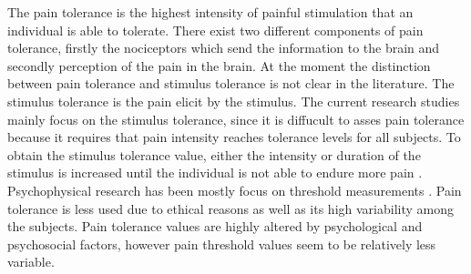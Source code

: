The pain tolerance is the highest intensity of painful stimulation that an individual is able to tolerate. There exist two different components of pain tolerance, firstly the nociceptors which send the information to the brain and secondly perception of the pain in the brain.
At the moment the distinction between pain tolerance and stimulus tolerance is not clear in the literature. The stimulus tolerance is the pain elicit by the stimulus. The current research studies mainly focus on the stimulus tolerance, since it is diffucult to asses pain tolerance because it requires that pain intensity reaches tolerance levels for all subjects. \cite{Sivert2007} To obtain the stimulus tolerance value, either the intensity or duration of the stimulus is increased until the individual is not able to endure more pain \cite{Yarnitsky2006}. Psychophysical research has been mostly focus on threshold measurements \cite{Pelli2010}. Pain tolerance is less used due to ethical reasons as well as its high variability among the subjects. Pain tolerance values are highly altered by psychological and psychosocial factors, however pain threshold values seem to be relatively less variable. \cite{Yarnitsky2006} 
